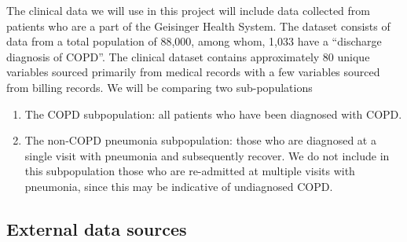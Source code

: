 \documentclass{article}
\begin{document}
The clinical data we will use in this project will include data collected from 
patients who are a part of the Geisinger Health System. The dataset consists of 
data from a total population of 88,000, among whom, 1,033 have 
a ``discharge diagnosis of COPD''. The clinical dataset contains approximately 
80 unique variables sourced primarily from medical records with a few variables 
sourced from billing records. We will be comparing two sub-populations

\begin{enumerate}
\item The COPD subpopulation: all patients who have been diagnosed with COPD.
\item The non-COPD pneumonia subpopulation: those who are diagnosed at a single 
visit with pneumonia and subsequently recover. We do not include in this 
subpopulation those who are re-admitted at multiple visits with pneumonia, 
since this may be indicative of undiagnosed COPD.
\end{enumerate}

\subsection{External data sources}
\end{document}
